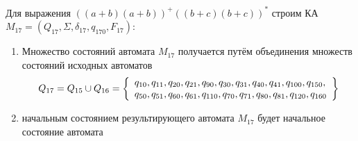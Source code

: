 \newpage
Для выражения \(((a+b)(a+b))^+((b+c)(b+c))^*\) строим КА \(M_{17}=(Q_{17}, \Sigma, \delta_{17}, q_{170}, F_{17})\):
\begin{enumerate}
	\item Множество состояний автомата \(M_{17}\) получается путём объединения множеств состояний исходных автоматов
	      \begin{align*}
		      Q_{17} = Q_{15} \cup Q_{16} =  \left\{
			      \begin{array}{l}
				      q_{10}, q_{11}, q_{20}, q_{21}, q_{90},q_{30}, q_{31}, q_{40}, q_{41}, q_{100}, q_{150}, \\
				      q_{50}, q_{51}, q_{60}, q_{61}, q_{110}, q_{70}, q_{71}, q_{80}, q_{81}, q_{120}, q_{160}
			      \end{array}\right\}
	      \end{align*}
	\item начальным состоянием результирующего автомата \(M_{17}\) будет начальное состояние автомата
\end{enumerate}
